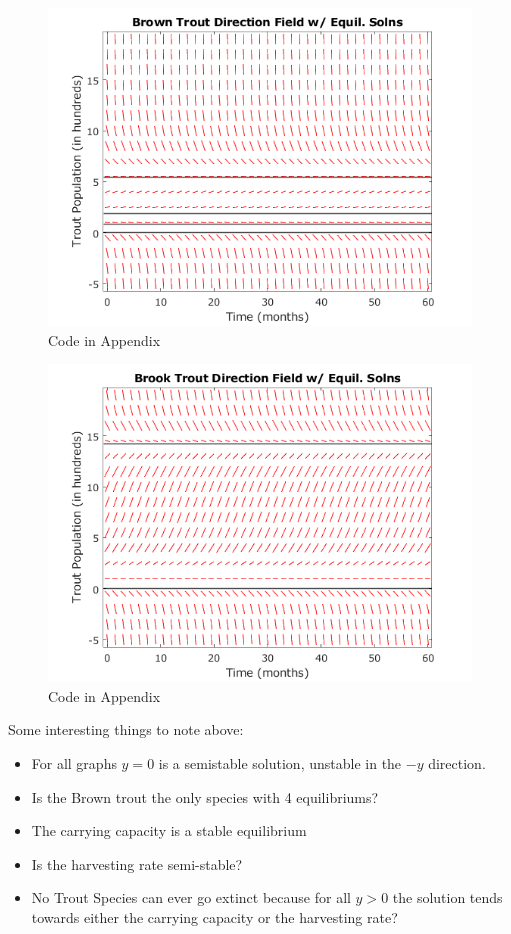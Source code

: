 \documentclass[letterpaper,12pt]{article}
\begin{document}
\begin{figure}[H]
    \centering
    \includegraphics{./figures/fig.3.4.2.png}
    \caption{Code in Appendix}
    \label{fig:5}
\end{figure}
\begin{figure}[H]
    \centering
    \includegraphics{./figures/fig.3.4.3.png}
    \caption{Code in Appendix}
    \label{fig:6}
\end{figure}
Some interesting things to note above:
\begin{itemize}
    \item For all graphs \(y = 0\) is a semistable solution, unstable in the \(-y\) direction.
    \item Is the Brown trout the only species with 4 equilibriums?
    \item The carrying capacity is a stable equilibrium
    \item Is the harvesting rate semi-stable?
    \item No Trout Species can ever go extinct because for all \(y > 0\) the solution tends towards either the carrying capacity or the harvesting rate?
\end{itemize}
\end{document}
